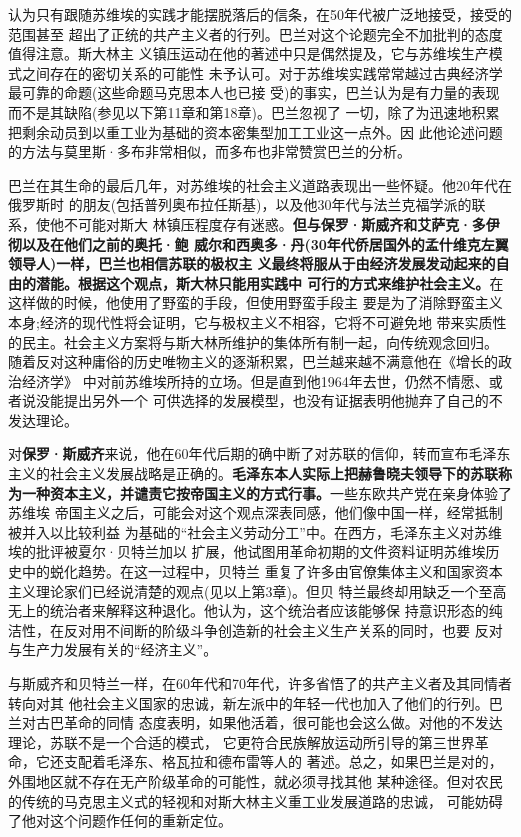认为只有跟随苏维埃的实践才能摆脱落后的信条，在50年代被广泛地接受，接受的范围甚至
超出了正统的共产主义者的行列。巴兰对这个论题完全不加批判的态度值得注意。斯大林主
义镇压运动在他的著述中只是偶然提及，它与苏维埃生产模式之间存在的密切关系的可能性
未予认可。对于苏维埃实践常常越过古典经济学最可靠的命题(这些命题马克思本人也已接
受)的事实，巴兰认为是有力量的表现而不是其缺陷(参见以下第11章和第18章)。巴兰忽视了
一切，除了为迅速地积累把剩余动员到以重工业为基础的资本密集型加工工业这一点外。因
此他论述问题的方法与莫里斯·多布非常相似，而多布也非常赞赏巴兰的分析。

巴兰在其生命的最后几年，对苏维埃的社会主义道路表现出一些怀疑。他20年代在俄罗斯时
的朋友(包括普列奥布拉任斯基)，以及他30年代与法兰克福学派的联系，使他不可能对斯大
林镇压程度存有迷惑。\textbf{但与保罗·斯威齐和艾萨克·多伊彻以及在他们之前的奥托·鲍
  威尔和西奥多·丹(30年代侨居国外的孟什维克左翼领导人)一样，巴兰也相信苏联的极权主
  义最终将服从于由经济发展发动起来的自由的潜能。根据这个观点，斯大林只能用实践中
  可行的方式来维护社会主义。}在这样做的时候，他使用了野蛮的手段，但使用野蛮手段主
要是为了消除野蛮主义本身;经济的现代性将会证明，它与极权主义不相容，它将不可避免地
带来实质性的民主。社会主义方案将与斯大林所维护的集体所有制一起，向传统观念回归。
随着反对这种庸俗的历史唯物主义的逐渐积累，巴兰越来越不满意他在《增长的政治经济学》
中对前苏维埃所持的立场。但是直到他1964年去世，仍然不情愿、或者说没能提出另外一个
可供选择的发展模型，也没有证据表明他抛弃了自己的不发达理论。

对\textbf{保罗·斯威齐}来说，他在60年代后期的确中断了对苏联的信仰，转而宣布毛泽东
主义的社会主义发展战略是正确的。\textbf{毛泽东本人实际上把赫鲁晓夫领导下的苏联称
  为一种资本主义，并谴责它按帝国主义的方式行事。}一些东欧共产党在亲身体验了苏维埃
帝国主义之后，可能会对这个观点深表同感，他们像中国一样，经常抵制被并入以比较利益
为基础的“社会主义劳动分工”中。在西方，毛泽东主义对苏维埃的批评被夏尔·贝特兰加以
扩展，他试图用革命初期的文件资料证明苏维埃历史中的蜕化趋势。在这一过程中，贝特兰
重复了许多由官僚集体主义和国家资本主义理论家们已经说清楚的观点(见以上第3章)。但贝
特兰最终却用缺乏一个至高无上的统治者来解释这种退化。他认为，这个统治者应该能够保
持意识形态的纯洁性，在反对用不间断的阶级斗争创造新的社会主义生产关系的同时，也要
反对与生产力发展有关的“经济主义”。

与斯威齐和贝特兰一样，在60年代和70年代，许多省悟了的共产主义者及其同情者转向对其
他社会主义国家的忠诚，新左派中的年轻一代也加入了他们的行列。巴兰对古巴革命的同情
态度表明，如果他活着，很可能也会这么做。对他的不发达理论，苏联不是一个合适的模式，
它更符合民族解放运动所引导的第三世界革命，它还支配着毛泽东、格瓦拉和德布雷等人的
著述。总之，如果巴兰是对的，外围地区就不存在无产阶级革命的可能性，就必须寻找其他
某种途径。但对农民的传统的马克思主义式的轻视和对斯大林主义重工业发展道路的忠诚，
可能妨碍了他对这个问题作任何的重新定位。

